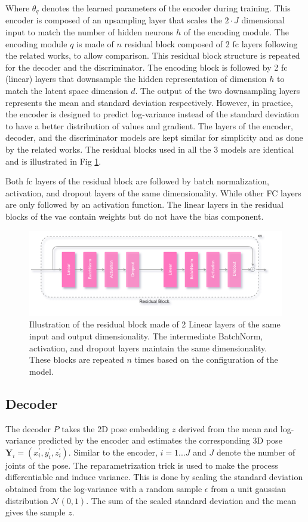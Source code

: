 Where $\theta_q$ denotes the learned parameters of the encoder during training. This encoder is composed of an upsampling layer that scales the $2\!\cdot\!J$ dimensional input to match the number of hidden neurons $h$ of the encoding module. The encoding module $q$ is made of $n$ residual block composed of 2 \ac{fc} layers following the related works, to allow comparison. This residual block structure is repeated for the decoder and the discriminator. The encoding block is followed by 2 \ac{fc} (linear) layers that downsample the hidden representation of dimension $h$ to match the latent space dimension $d$. The output of the two downsampling layers represents the mean and standard deviation respectively. However, in practice, the encoder is designed to predict log-variance instead of the standard deviation to have a better distribution of values and gradient. The layers of the encoder, decoder, and the discriminator models are kept similar for simplicity and as done by the related works. The residual blocks used in all the 3 models are identical and is illustrated in Fig \ref{fig:residual_block}.

Both \ac{fc} layers of the residual block are followed by batch normalization, activation, and dropout layers of the same dimensionality. While other \ac{FC} layers are only followed by an activation function. The linear layers in the residual blocks of the \ac{vae} contain weights but do not have the bias component.


\begin{figure}[h] 
    \centering
    \includegraphics[width=\textwidth]{figures/arch/res_block.png}
    \caption{Illustration of the residual block made of 2 Linear layers of the same input and output dimensionality. The intermediate BatchNorm, activation, and dropout layers maintain the same dimensionality. These blocks are repeated $n$ times based on the configuration of the model.
    }
    \label{fig:residual_block}
\end{figure}

\subsection{Decoder}
The decoder $P$ takes the 2D pose embedding $z$ derived from the mean and log-variance predicted by the encoder and estimates the corresponding 3D pose $\textbf{Y}_i = (x^\prime_i, y^\prime_i, z^\prime_i)$. Similar to the encoder, $i = 1 ... J$ and $J$ denote the number of joints of the pose. The reparametrization trick is used to make the process differentiable and induce variance. This is done by scaling the standard deviation obtained from the log-variance with a random sample $\epsilon$ from a unit gaussian distribution $\mathcal{N}(0,1)$. The sum of the scaled standard deviation and the mean gives the sample $z$.


